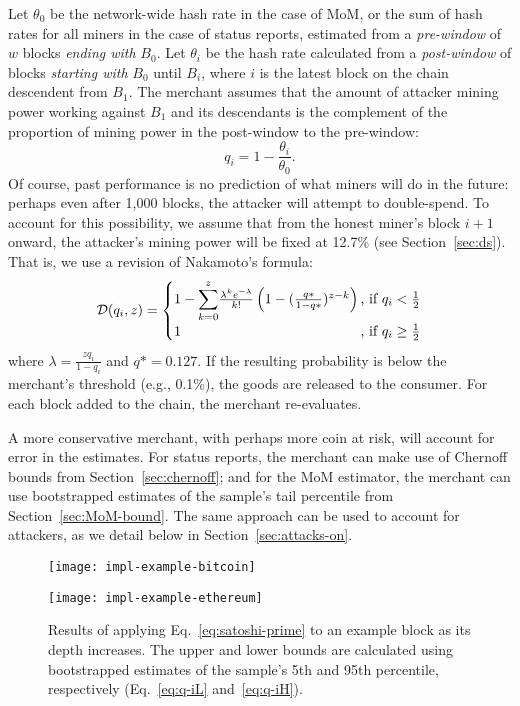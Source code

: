 \documentclass[10pt,sigconf]{acmart}
\newcommand{\para }[1]{\smallskip \noindent {\bf #1}}
\newcommand{\1}{{\em (i)}}
\newcommand{\2}{{\em (ii)}}
\newcommand{\3}{{\em (iii)}}
\newcommand{\4}{{\em (iv)}}
\newcommand{\5}{{\em (v)}}
\begin{document}
Let $\theta_0$ be the network-wide hash rate in the case of MoM, or the
sum of hash rates for all miners in the case of status
reports, estimated from a {\em pre-window} of $w$ blocks {\em ending with}
$B_0$. Let $\theta_i$ be the   hash rate calculated from a {\em post-window}
of blocks {\em starting with} $B_0$ until $B_i$, where $i$ is the latest block on the chain descendent from $B_1$. The merchant assumes
that the amount of attacker mining power working against $B_1$ and its
descendants is the complement of the  proportion of mining power in the post-window to the pre-window:
\begin{equation}
q_i=1-\frac{\theta_i}{\theta_0}.\label{eq:q-i}
\end{equation}
Of course, past performance is no prediction of
what miners will do in the future: perhaps even after 1,000 blocks,
the attacker will attempt to double-spend. To account for this
possibility, we assume that from the honest miner's block $i+1$
onward, the attacker's mining power will be fixed at 12.7\% (see Section~\ref{sec:ds}). That is, we
use a revision of Nakamoto's formula:
\begin{align}
  \mathcal{D}(q_i,z)=\begin{cases} 
 1- \mathlarger{\sum}_{k=0}^{z} \frac{\lambda^k e^{-\lambda}}{k!}\left(1-(\frac{q*}{1-q*})^{z-k}\right)
   & \!\!\!\!\!\text{, if }  q_i<\frac12 \\ 
    1 & \!\!\!\!\! \text{, if } q_i\geq\frac12 \\
  \end{cases}\label{eq:satoshi-prime}
\end{align}
where $\lambda=\frac{zq_i}{1-q_i}$ and $q*=0.127$.
If the resulting probability is below the merchant's threshold (e.g., 0.1\%), the goods are released to the consumer. 
For each block added to the chain, the merchant re-evaluates.



\para{Bounding risk.} A more conservative merchant, with perhaps more coin at risk, will account for  error in the estimates. For status
reports, the merchant can  make use of Chernoff bounds from Section~\ref{sec:chernoff}; and for  the MoM
estimator, the merchant can use bootstrapped estimates of the sample's tail
percentile from Section~\ref{sec:MoM-bound}. The same approach can be used to account for attackers, as we detail below in Section~\ref{sec:attacks-on}. 


\begin{figure}[t] 
\centerline{\texttt{[image: impl-example-bitcoin]} }
\centerline{\texttt{[image: impl-example-ethereum]} }
\caption{Results of applying Eq.~\ref{eq:satoshi-prime} to an example block
  as its depth increases. The upper and lower bounds are calculated
  using bootstrapped estimates of the sample's 5th  and 95th   percentile, respectively (Eq.~\ref{eq:q-iL} and~\ref{eq:q-iH}).}
\label{fig:depth-ex-prob} 
\end{figure}
\end{document}
